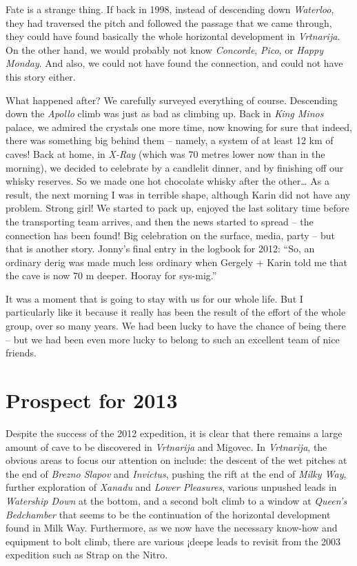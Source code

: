Fate is a strange thing. If back in 1998, instead of descending down
\emph{Waterloo}, they had traversed the pitch and followed the passage
that we came through, they could have found basically the whole
horizontal development in \emph{Vrtnarija}. On the other hand, we would
probably not know \emph{Concorde}, \emph{Pico}, or \emph{Happy Monday}.
And also, we could not have found the connection, and could not have
this story either.

What happened after? We carefully surveyed everything of course.
Descending down the \emph{Apollo} climb was just as bad as climbing up.
Back in \emph{King Minos} palace, we admired the crystals one more time,
now knowing for sure that indeed, there was something big behind them --
namely, a system of at least 12 km of caves! Back at home, in
\emph{X-Ray} (which was 70 metres lower now than in the morning), we
decided to celebrate by a candlelit dinner, and by finishing off our
whisky reserves. So we made one hot chocolate whisky after the
other\ldots{} As a result, the next morning I was in terrible shape,
although Karin did not have any problem. Strong girl! We started to pack
up, enjoyed the last solitary time before the transporting team arrives,
and then the news started to spread -- the connection has been found!
Big celebration on the surface, media, party -- but that is another
story. Jonny's final entry in the logbook for 2012: ``So, an ordinary
derig was made much less ordinary when Gergely + Karin told me that the
cave is now 70 m deeper. Hooray for sys-mig.''

It was a moment that is going to stay with us for our whole life. But I
particularly like it because it really has been the result of the effort
of the whole group, over so many years. We had been lucky to have the
chance of being there -- but we had been even more lucky to belong to
such an excellent team of nice friends.


\hypertarget{prospect-for-2013}{%
\section{Prospect for 2013}\label{prospect-for-2013}}

Despite the success of the 2012 expedition, it is clear that there
remains a large amount of cave to be discovered in \emph{Vrtnarija} and
Migovec. In \emph{Vrtnarija}, the obvious areas to focus our attention
on include: the descent of the wet pitches at the end of \emph{Brezno
Slapov} and \emph{Invictus}, pushing the rift at the end of \emph{Milky
Way}, further exploration of \emph{Xanadu} and \emph{Lower Pleasures},
various unpushed leads in \emph{Watership Down} at the bottom, and a
second bolt climb to a window at \emph{Queen's Bedchamber} that seems to
be the continuation of the horizontal development found in Milk Way.
Furthermore, as we now have the necessary know-how and equipment to bolt
climb, there are various ¡deep¢ leads to revisit from the 2003
expedition such as Strap on the Nitro.

